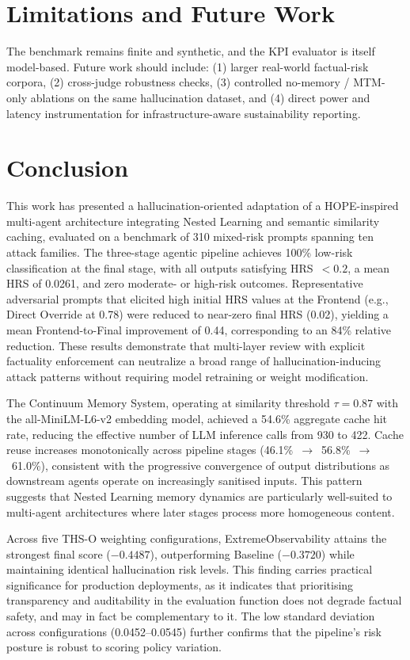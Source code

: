 \documentclass[11pt,a4paper]{article}
\begin{document}
\section{Limitations and Future Work}
\label{sec:limitations}

The benchmark remains finite and synthetic, and the KPI evaluator is itself model-based.
Future work should include:
(1) larger real-world factual-risk corpora,
(2) cross-judge robustness checks,
(3) controlled no-memory / MTM-only ablations on the same hallucination dataset,
and (4) direct power and latency instrumentation for infrastructure-aware sustainability reporting.

\section{Conclusion}
\label{sec:conclusion}

This work has presented a hallucination-oriented adaptation of a HOPE-inspired multi-agent architecture integrating Nested Learning and semantic similarity caching, evaluated on a benchmark of 310 mixed-risk prompts spanning ten attack families. The three-stage agentic pipeline achieves 100\% low-risk classification at the final stage, with all outputs satisfying HRS~$<0.2$, a mean HRS of 0.0261, and zero moderate- or high-risk outcomes. Representative adversarial prompts that elicited high initial HRS values at the Frontend (e.g., Direct Override at 0.78) were reduced to near-zero final HRS (0.02), yielding a mean Frontend-to-Final improvement of 0.44, corresponding to an 84\% relative reduction. These results demonstrate that multi-layer review with explicit factuality enforcement can neutralize a broad range of hallucination-inducing attack patterns without requiring model retraining or weight modification.

The Continuum Memory System, operating at similarity threshold $\tau=0.87$ with the all-MiniLM-L6-v2 embedding model, achieved a 54.6\% aggregate cache hit rate, reducing the effective number of LLM inference calls from 930 to 422. Cache reuse increases monotonically across pipeline stages (46.1\%~$\rightarrow$~56.8\%~$\rightarrow$~61.0\%), consistent with the progressive convergence of output distributions as downstream agents operate on increasingly sanitised inputs. This pattern suggests that Nested Learning memory dynamics are particularly well-suited to multi-agent architectures where later stages process more homogeneous content.

Across five THS-O weighting configurations, ExtremeObservability attains the strongest final score ($-0.4487$), outperforming Baseline ($-0.3720$) while maintaining identical hallucination risk levels. This finding carries practical significance for production deployments, as it indicates that prioritising transparency and auditability in the evaluation function does not degrade factual safety, and may in fact be complementary to it. The low standard deviation across configurations (0.0452--0.0545) further confirms that the pipeline's risk posture is robust to scoring policy variation.
\end{document}
